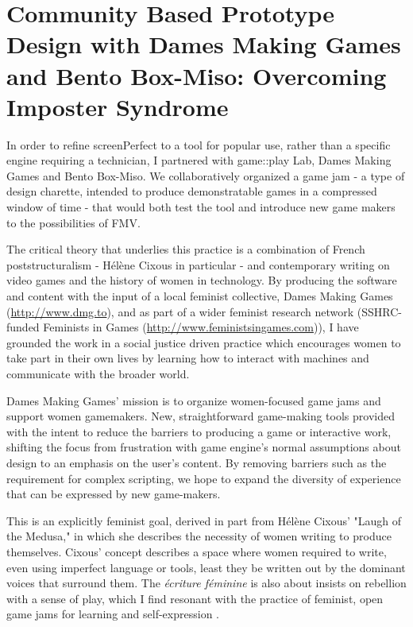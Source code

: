 \section{Community Based Prototype Design with Dames Making Games and Bento Box-Miso: Overcoming Imposter Syndrome}

In order to refine screenPerfect to a tool for popular use, rather than a specific engine requiring a technician, I partnered with game::play Lab, Dames Making Games and Bento Box-Miso. We collaboratively organized a game jam - a type of design charette, intended to produce demonstratable games in a compressed window of time - that would both test the tool and introduce new game makers to the possibilities of FMV.

The critical theory that underlies this practice is a combination of French poststructuralism - H\'{e}l\`{e}ne Cixous in particular - and contemporary writing on video games and the history of women in technology. By producing the software and content with the input of a local feminist collective, Dames Making Games (\url{http://www.dmg.to}), and as part of a wider feminist research network (SSHRC-funded Feminists in Games (\url{http://www.feministsingames.com})), I have grounded the work in a social justice driven practice which encourages women to take part in their own lives by learning how to interact with machines and communicate with the broader world.

Dames Making Games' mission is to organize women-focused game jams and support women gamemakers. New, straightforward game-making tools provided with the intent to reduce the barriers to producing a game or interactive work, shifting the focus from frustration with game engine's normal assumptions about design to an emphasis on the user's content. By removing barriers such as the requirement for complex scripting, we hope to expand the diversity of experience that can be expressed by new game-makers. 

This is an explicitly feminist goal, derived in part from H\'{e}l\`{e}ne Cixous' "Laugh of the Medusa," in which she describes the necessity of women writing to produce themselves. Cixous' concept describes a space where women required to write, even using imperfect language or tools, least they be written out by the dominant voices that surround them. The \textit{écriture féminine} is also about insists on rebellion with a sense of play, which I find resonant with the practice of feminist, open game jams for learning and self-expression \parencite{cixous}. 

